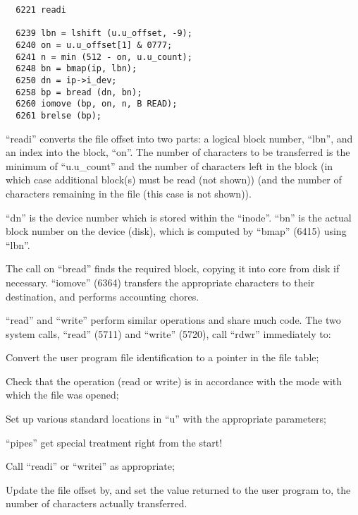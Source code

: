 \begin{verbatim}
  6221 readi

  6239 lbn = lshift (u.u_offset, -9);
  6240 on = u.u_offset[1] & 0777;
  6241 n = min (512 - on, u.u_count);
  6248 bn = bmap(ip, lbn);
  6250 dn = ip->i_dev;
  6258 bp = bread (dn, bn);
  6260 iomove (bp, on, n, B READ);
  6261 brelse (bp);

\end{verbatim}

``readi'' converts the file offset into
two parts: a logical block number,
``lbn'', and an index into the block,
``on''. The number of characters to be
transferred is the minimum of
``u.u\_count'' and the number of characters left in the block (in which case
additional block(s) must be read (not
shown)) (and the number of characters
remaining in the file (this case is not
shown)).

``dn'' is the device number which is
stored within the ``inode''. ``bn'' is the
actual block number on the device
(disk), which is computed by ``bmap''
(6415) using ``lbn''.

The call on ``bread'' finds the required
block, copying it into core from disk
if necessary. ``iomove'' (6364)
transfers the appropriate characters to
their destination, and performs
accounting chores.




``read'' and ``write'' perform similar
operations and share much code. The
two system calls, ``read'' (5711) and
``write'' (5720), call ``rdwr'' immediately
to:

\bd
\item[5736:] Convert the user program file
 identification to a pointer in
 the file table;

\item[5739:] Check that the operation (read or
 write) is in accordance with the
 mode with which the file was
 opened;

\item[5743:] Set up various standard locations
 in ``u'' with the appropriate
 parameters;

\item[5746:] ``pipes'' get special treatment
 right from the start!

\item[5755:] Call ``readi'' or ``writei'' as
 appropriate;

 \item[5756:] Update the file offset by, and
set the value returned to the
user program to, the number of
characters actually transferred.
\ed

